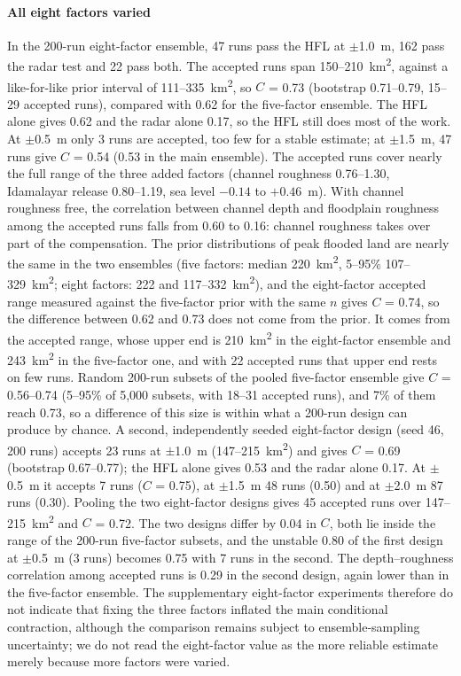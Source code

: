 \documentclass[preprint,12pt,authoryear]{elsarticle}
\newcommand{\kmsq}{km\textsuperscript{2}}
\begin{document}
\paragraph{All eight factors varied} In the 200-run eight-factor ensemble, 47 runs pass the HFL at $\pm$1.0~m, 162 pass the radar test and 22 pass both. The accepted runs span 150--210~\kmsq, against a like-for-like prior interval of 111--335~\kmsq, so $C$ = 0.73 (bootstrap 0.71--0.79, 15--29 accepted runs), compared with 0.62 for the five-factor ensemble. The HFL alone gives 0.62 and the radar alone 0.17, so the HFL still does most of the work. At $\pm$0.5~m only 3 runs are accepted, too few for a stable estimate; at $\pm$1.5~m, 47 runs give $C$ = 0.54 (0.53 in the main ensemble). The accepted runs cover nearly the full range of the three added factors (channel roughness 0.76--1.30, Idamalayar release 0.80--1.19, sea level $-0.14$ to $+0.46$~m). With channel roughness free, the correlation between channel depth and floodplain roughness among the accepted runs falls from 0.60 to 0.16: channel roughness takes over part of the compensation. The prior distributions of peak flooded land are nearly the same in the two ensembles (five factors: median 220~\kmsq, 5--95\% 107--329~\kmsq; eight factors: 222 and 117--332~\kmsq), and the eight-factor accepted range measured against the five-factor prior with the same $n$ gives $C$ = 0.74, so the difference between 0.62 and 0.73 does not come from the prior. It comes from the accepted range, whose upper end is 210~\kmsq{} in the eight-factor ensemble and 243~\kmsq{} in the five-factor one, and with 22 accepted runs that upper end rests on few runs. Random 200-run subsets of the pooled five-factor ensemble give $C$ = 0.56--0.74 (5--95\% of 5,000 subsets, with 18--31 accepted runs), and 7\% of them reach 0.73, so a difference of this size is within what a 200-run design can produce by chance. A second, independently seeded eight-factor design (seed 46, 200 runs) accepts 23 runs at $\pm$1.0~m (147--215~\kmsq) and gives $C$ = 0.69 (bootstrap 0.67--0.77); the HFL alone gives 0.53 and the radar alone 0.17. At $\pm$0.5~m it accepts 7 runs ($C$ = 0.75), at $\pm$1.5~m 48 runs (0.50) and at $\pm$2.0~m 87 runs (0.30). Pooling the two eight-factor designs gives 45 accepted runs over 147--215~\kmsq{} and $C$ = 0.72. The two designs differ by 0.04 in $C$, both lie inside the range of the 200-run five-factor subsets, and the unstable 0.80 of the first design at $\pm$0.5~m (3 runs) becomes 0.75 with 7 runs in the second. The depth--roughness correlation among accepted runs is 0.29 in the second design, again lower than in the five-factor ensemble. The supplementary eight-factor experiments therefore do not indicate that fixing the three factors inflated the main conditional contraction, although the comparison remains subject to ensemble-sampling uncertainty; we do not read the eight-factor value as the more reliable estimate merely because more factors were varied.
\end{document}
